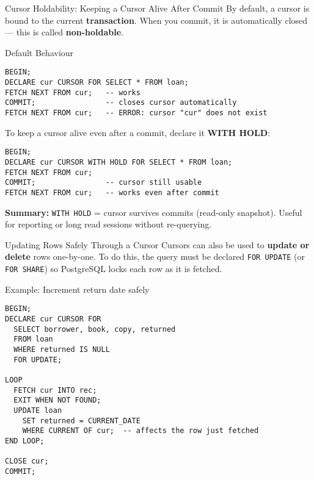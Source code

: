 \documentclass{beamer}
\begin{document}
\begin{frame}[fragile]{Cursor Holdability: Keeping a Cursor Alive After Commit}
\small
By default, a cursor is bound to the current \textbf{transaction}.  
When you commit, it is automatically closed — this is called \textbf{non-holdable}.

\begin{block}{Default Behaviour}
\begin{lstlisting}
BEGIN;
DECLARE cur CURSOR FOR SELECT * FROM loan;
FETCH NEXT FROM cur;   -- works
COMMIT;                -- closes cursor automatically
FETCH NEXT FROM cur;   -- ERROR: cursor "cur" does not exist
\end{lstlisting}
\end{block}

To keep a cursor alive even after a commit, declare it \textbf{WITH HOLD}:
\begin{lstlisting}
BEGIN;
DECLARE cur CURSOR WITH HOLD FOR SELECT * FROM loan;
FETCH NEXT FROM cur;
COMMIT;                -- cursor still usable
FETCH NEXT FROM cur;   -- works even after commit
\end{lstlisting}

\textcolor{nus-blue}{\textbf{Summary:}}  
\texttt{WITH HOLD} = cursor survives commits (read-only snapshot).  
Useful for reporting or long read sessions without re-querying.
\end{frame}

\begin{frame}[fragile]{Updating Rows Safely Through a Cursor}
\small
Cursors can also be used to \textbf{update or delete} rows one-by-one.  
To do this, the query must be declared \texttt{FOR UPDATE} (or \texttt{FOR SHARE})  
so PostgreSQL locks each row as it is fetched.

\begin{block}{Example: Increment return date safely}
\begin{lstlisting}
BEGIN;
DECLARE cur CURSOR FOR
  SELECT borrower, book, copy, returned
  FROM loan
  WHERE returned IS NULL
  FOR UPDATE;

LOOP
  FETCH cur INTO rec;
  EXIT WHEN NOT FOUND;
  UPDATE loan
    SET returned = CURRENT_DATE
    WHERE CURRENT OF cur;  -- affects the row just fetched
END LOOP;

CLOSE cur;
COMMIT;
\end{lstlisting}
\end{block}
\end{frame}
\end{document}
